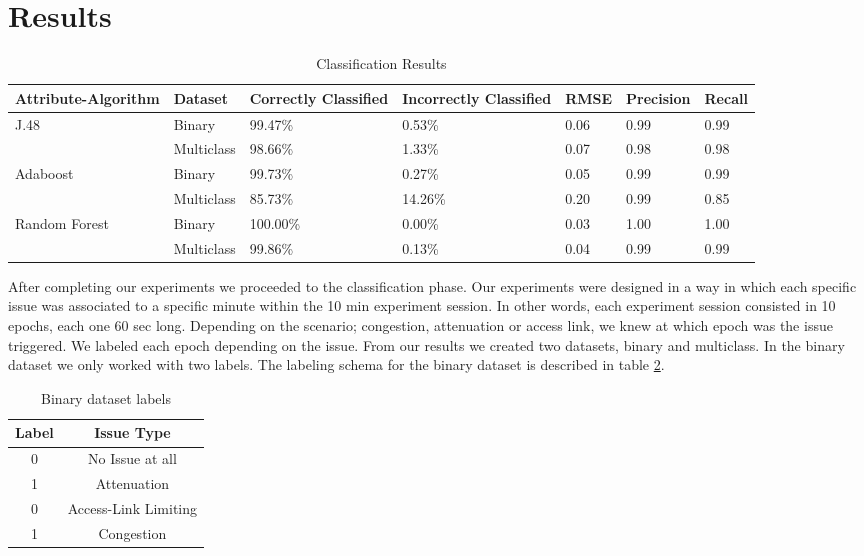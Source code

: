 \section{Results}\label{Results}

\begin{table}[bp]
	\begin{center}
		\begin{tabular}{|| m{2.5cm} | m{2cm} | m{2cm}| m{2cm} | m{2cm}| m{2cm} | m{2cm}  ||}
			\hline
			 Attribute-Algorithm & Dataset & Correctly Classified & Incorrectly Classified & RMSE & Precision & Recall \\ [0.5ex] 
			\hline\hline
			\multirow{2}{*}{J.48} & Binary & 99.47\% & 0.53\% & 0.06 & 0.99 & 0.99 \\
			& Multiclass & 98.66\% & 1.33\% & 0.07 & 0.98 & 0.98 \\
			\multirow{2}{*}{Adaboost} & Binary & 99.73\% & 0.27\% & 0.05 & 0.99 & 0.99 \\
			& Multiclass & 85.73\% & 14.26\% & 0.20 & 0.99 & 0.85 \\
			\multirow{2}{*}{Random Forest} & Binary & 100.00\% & 0.00\% & 0.03 & 1.00 & 1.00 \\
			& Multiclass & 99.86\% & 0.13\% & 0.04 & 0.99 & 0.99 \\
			\hline
		\end{tabular}
		\caption{Classification Results}
		\label{table:classification_results}
	\end{center}
\end{table}

After completing our experiments we proceeded to the classification phase. Our experiments were designed in a way in which each specific issue was associated to a specific minute within the 10 min experiment session. In other words, each experiment session consisted in 10 epochs, each one 60 sec long. Depending on the scenario; congestion, attenuation or access link, we knew at which epoch was the issue triggered. We labeled each epoch depending on the issue. From our results we created two datasets, binary and multiclass. In the binary dataset we only worked with two labels. The labeling schema for the binary dataset is described in table \ref{table:binary_labels}.

\begin{table}[!h]
	\begin{center}
		\begin{tabular}{||c c||} 
			\hline
			Label & Issue Type\\ [0.5ex] 
			\hline\hline
			0 & No Issue at all \\ 
			\hline
			1 & Attenuation\\
			\hline
			0 & Access-Link Limiting \\
			\hline
			1 & Congestion \\[1ex] 
			\hline
		\end{tabular}
		\caption{Binary dataset labels}
		\label{table:binary_labels}
	\end{center}
\end{table}

